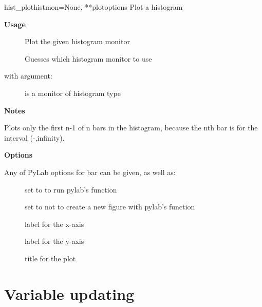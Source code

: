 \documentclass[letterpaper,10pt,english]{manual}
\begin{document}
\hypertarget{brian.hist_plot}{}\begin{funcdesc}{hist\_plot}{histmon=None, **plotoptions}
Plot a histogram

\textbf{Usage}
\begin{description}
\item[] \leavevmode
Plot the given histogram monitor

\item[] \leavevmode
Guesses which histogram monitor to use

\end{description}

with argument:
\begin{description}
\item[] \leavevmode
is a monitor of histogram type

\end{description}

\textbf{Notes}

Plots only the first n-1 of n bars in the histogram, because
the nth bar is for the interval (-,infinity).

\textbf{Options}

Any of PyLab options for bar can be given, as well as:
\begin{description}
\item[] \leavevmode
set to  to run pylab's  function

\item[] \leavevmode
set to  not to create a new figure with pylab's  function

\item[] \leavevmode
label for the x-axis

\item[] \leavevmode
label for the y-axis

\item[] \leavevmode
title for the plot

\end{description}
\end{funcdesc}

\resetcurrentobjects
\hypertarget{--doc-reference-variableupdating}{}

\section{Variable updating}
\end{document}
